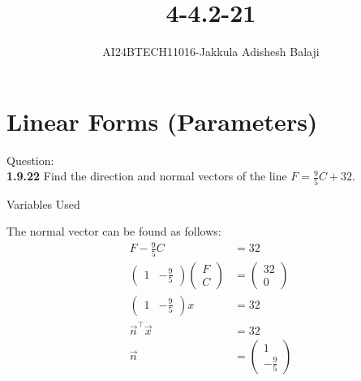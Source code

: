 \documentclass[journal]{IEEEtran}
\begin{document}

\renewcommand{\thefigure}{\theenumi}
\renewcommand{\thetable}{\theenumi}
\setlength{\intextsep}{10pt} %
\title{4-4.2-21}
\author{AI24BTECH11016-Jakkula Adishesh Balaji}
\maketitle

\section*{\textbf{Linear Forms (Parameters)}}
\parindent 0pt
Question: \\
\textbf{1.9.22} Find the direction and normal vectors of the line \( F = \frac{9}{5}C + 32 \).

\begin{table}[h!]    	
    \centering
    
    \caption{Variables Used}
    \label{tab1-1.9-6}
\end{table}

\solution
The normal vector can be found as follows:
\begin{align}
    F - \frac{9}{5}C &= 32 \\
    \begin{pmatrix} 1 & -\frac{9}{5} \end{pmatrix} \begin{pmatrix} F \\ C \end{pmatrix} &= \begin{pmatrix} 32 \\ 0 \end{pmatrix} \\
    \begin{pmatrix} 1 & -\frac{9}{5} \end{pmatrix} x &= 32 \\
    \vec{n}^\top \vec{x} &= 32\\
    \vec{n} &= \begin{pmatrix} 1 \\ -\frac{9}{5} \end{pmatrix}
\end{align}
\end{document}
